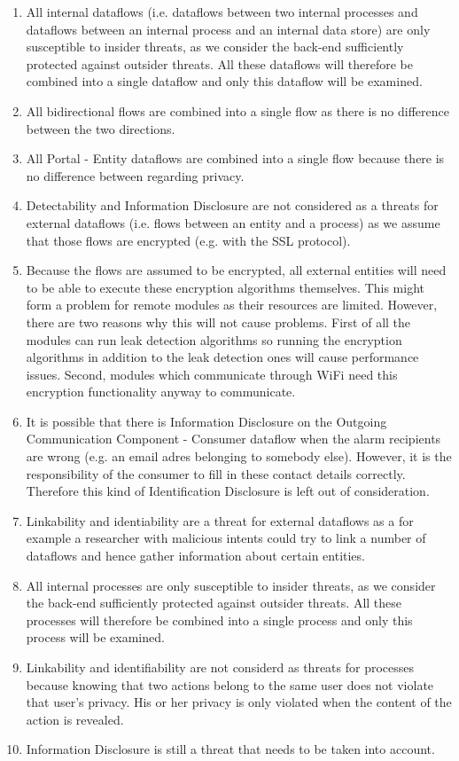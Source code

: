 \begin{enumerate}
  \item All internal dataflows (i.e. dataflows between two internal processes
  and dataflows between an internal process and an internal data store) are only
  susceptible to insider threats, as we consider the back-end sufficiently
  protected against outsider threats. All these dataflows will therefore be
  combined into a single dataflow and only this dataflow will be examined.
  \item All bidirectional flows are combined into a single flow as there is no
  difference between the two directions. 
  \item All Portal - Entity dataflows are combined into a single flow because
  there is no difference between regarding privacy. %
  \item Detectability and Information Disclosure are not considered as a threats
  for external dataflows (i.e. flows between an entity and a process) as we
  assume that those flows are encrypted (e.g. with the SSL protocol).
  \item Because the flows are assumed to be encrypted, all external entities
  will need to be able to execute these encryption algorithms themselves. This
  might form a problem for remote modules as their resources are limited.
  However, there are two reasons why this will not cause problems. First of all
  the modules can run leak detection algorithms so running the encryption
  algorithms in addition to the leak detection ones will cause performance
  issues. Second, modules which communicate through WiFi need this encryption
  functionality anyway to communicate.
  \item It is possible that there is Information Disclosure on the Outgoing
  Communication Component - Consumer dataflow when the alarm recipients are
  wrong (e.g. an email adres belonging to somebody else). However, it is the
  responsibility of the consumer to fill in these contact details correctly.
  Therefore this kind of Identification Disclosure is left out of consideration.
  \item Linkability and identiability are a threat for external dataflows as a
  for example a researcher with malicious intents could try to link a number of
  dataflows and hence gather information about certain entities.

  \item All internal processes are only susceptible to insider threats, as we
  consider the back-end sufficiently protected against outsider threats. All
  these processes will therefore be combined into a single process and only
  this process will be examined. 
  \item Linkability and identifiability are not considerd as threats for
  processes because knowing that two actions belong to the same user does not
  violate that user's privacy. His or her privacy is only violated when the
  content of the action is revealed.
  \item Information Disclosure is still a threat that needs to be taken into
  account.
  

\end{enumerate}
